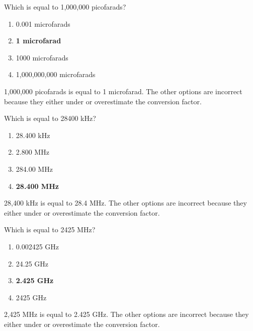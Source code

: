 \begin{tcolorbox}[colback=gray!10!white,colframe=black!75!black,title={T5B08}]
    Which is equal to 1,000,000 picofarads?
    \begin{enumerate}[label=\Alph*),noitemsep]
        \item 0.001 microfarads
        \item \textbf{1 microfarad}
        \item 1000 microfarads
        \item 1,000,000,000 microfarads
    \end{enumerate}
\end{tcolorbox}
1,000,000 picofarads is equal to 1 microfarad. The other options are incorrect because they either under or overestimate the conversion factor.

\begin{tcolorbox}[colback=gray!10!white,colframe=black!75!black,title={T5B12}]
    Which is equal to 28400 kHz?
    \begin{enumerate}[label=\Alph*),noitemsep]
        \item 28.400 kHz
        \item 2.800 MHz
        \item 284.00 MHz
        \item \textbf{28.400 MHz}
    \end{enumerate}
\end{tcolorbox}
28,400 kHz is equal to 28.4 MHz. The other options are incorrect because they either under or overestimate the conversion factor.

\begin{tcolorbox}[colback=gray!10!white,colframe=black!75!black,title={T5B13}]
    Which is equal to 2425 MHz?
    \begin{enumerate}[label=\Alph*),noitemsep]
        \item 0.002425 GHz
        \item 24.25 GHz
        \item \textbf{2.425 GHz}
        \item 2425 GHz
    \end{enumerate}
\end{tcolorbox}
2,425 MHz is equal to 2.425 GHz. The other options are incorrect because they either under or overestimate the conversion factor.
